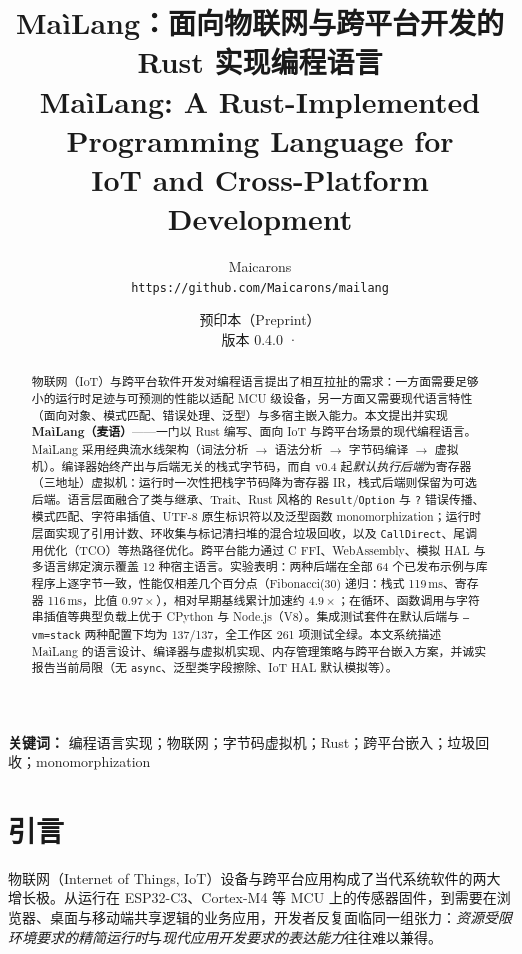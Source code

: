 \documentclass[10pt,a4paper]{article}
\title{%
  \textbf{MaìLang：面向物联网与跨平台开发的\\
  Rust 实现编程语言}\\[6pt]
  \large MaìLang: A Rust-Implemented Programming Language for\\
  IoT and Cross-Platform Development
}
\author{%
  Maicarons\\
  \texttt{https://github.com/Maicarons/mailang}
}
\date{%
  预印本（Preprint）\\
  版本 0.4.0 \quad · \quad 2026
}
\begin{document}
\maketitle

\begin{abstract}
物联网（IoT）与跨平台软件开发对编程语言提出了相互拉扯的需求：一方面需要足够小的运行时足迹与可预测的性能以适配 MCU 级设备，另一方面又需要现代语言特性（面向对象、模式匹配、错误处理、泛型）与多宿主嵌入能力。本文提出并实现 \textbf{MaìLang（麦语）}——一门以 Rust 编写、面向 IoT 与跨平台场景的现代编程语言。MaìLang 采用经典流水线架构（词法分析 $\rightarrow$ 语法分析 $\rightarrow$ 字节码编译 $\rightarrow$ 虚拟机）。编译器始终产出与后端无关的栈式字节码，而自 v0.4 起\emph{默认执行后端}为寄存器（三地址）虚拟机：运行时一次性把栈字节码降为寄存器 IR，栈式后端则保留为可选后端。语言层面融合了类与继承、Trait、Rust 风格的 \texttt{Result}/\texttt{Option} 与 \texttt{?} 错误传播、模式匹配、字符串插值、UTF-8 原生标识符以及泛型函数 monomorphization；运行时层面实现了引用计数、环收集与标记清扫堆的混合垃圾回收，以及 \texttt{CallDirect}、尾调用优化（TCO）等热路径优化。跨平台能力通过 C FFI、WebAssembly、模拟 HAL 与多语言绑定演示覆盖 12 种宿主语言。实验表明：两种后端在全部 64 个已发布示例与库程序上逐字节一致，性能仅相差几个百分点（Fibonacci(30) 递归：栈式 119\,ms、寄存器 116\,ms，比值 $0.97\times$），相对早期基线累计加速约 $4.9\times$；在循环、函数调用与字符串插值等典型负载上优于 CPython 与 Node.js（V8）。集成测试套件在默认后端与 \texttt{--vm=stack} 两种配置下均为 137/137，全工作区 261 项测试全绿。本文系统描述 MaìLang 的语言设计、编译器与虚拟机实现、内存管理策略与跨平台嵌入方案，并诚实报告当前局限（无 \texttt{async}、泛型类字段擦除、IoT HAL 默认模拟等）。
\end{abstract}

\vspace{1em}
\noindent\textbf{关键词：} 编程语言实现；物联网；字节码虚拟机；Rust；跨平台嵌入；垃圾回收；monomorphization

\section{引言}
\label{sec:intro}

物联网（Internet of Things, IoT）设备与跨平台应用构成了当代系统软件的两大增长极。从运行在 ESP32-C3、Cortex-M4 等 MCU 上的传感器固件，到需要在浏览器、桌面与移动端共享逻辑的业务应用，开发者反复面临同一组张力：\emph{资源受限环境要求的精简运行时}与\emph{现代应用开发要求的表达能力}往往难以兼得。
\end{document}
